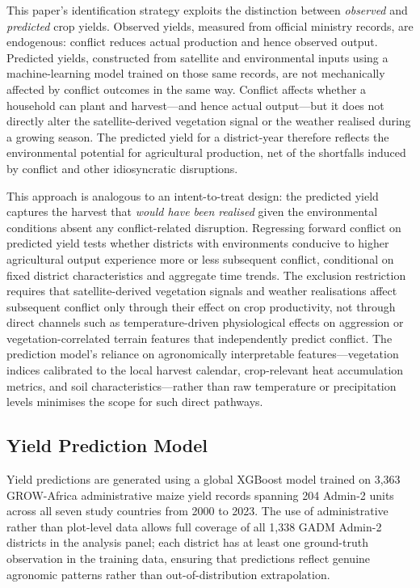 This paper's identification strategy exploits the distinction between \textit{observed} and \textit{predicted} crop yields. Observed yields, measured from official ministry records, are endogenous: conflict reduces actual production and hence observed output. Predicted yields, constructed from satellite and environmental inputs using a machine-learning model trained on those same records, are not mechanically affected by conflict outcomes in the same way. Conflict affects whether a household can plant and harvest---and hence actual output---but it does not directly alter the satellite-derived vegetation signal or the weather realised during a growing season. The predicted yield for a district-year therefore reflects the environmental potential for agricultural production, net of the shortfalls induced by conflict and other idiosyncratic disruptions.

This approach is analogous to an intent-to-treat design: the predicted yield captures the harvest that \textit{would have been realised} given the environmental conditions absent any conflict-related disruption. Regressing forward conflict on predicted yield tests whether districts with environments conducive to higher agricultural output experience more or less subsequent conflict, conditional on fixed district characteristics and aggregate time trends. The exclusion restriction requires that satellite-derived vegetation signals and weather realisations affect subsequent conflict only through their effect on crop productivity, not through direct channels such as temperature-driven physiological effects on aggression \citep{BurkeHsiangMiguel2015} or vegetation-correlated terrain features that independently predict conflict. The prediction model's reliance on agronomically interpretable features---vegetation indices calibrated to the local harvest calendar, crop-relevant heat accumulation metrics, and soil characteristics---rather than raw temperature or precipitation levels minimises the scope for such direct pathways.

\subsection{Yield Prediction Model}

Yield predictions are generated using a global XGBoost model \citep{ChenGuestrin2016} trained on 3,363 GROW-Africa administrative maize yield records spanning 204 Admin-2 units across all seven study countries from 2000 to 2023. The use of administrative rather than plot-level data allows full coverage of all 1,338 GADM Admin-2 districts in the analysis panel; each district has at least one ground-truth observation in the training data, ensuring that predictions reflect genuine agronomic patterns rather than out-of-distribution extrapolation.

